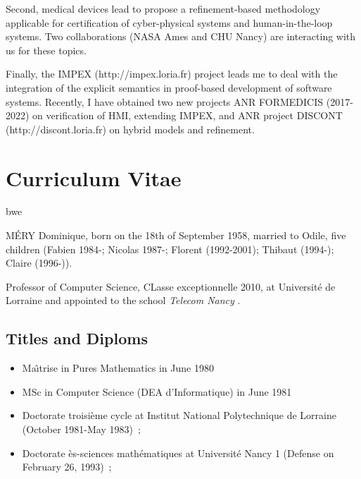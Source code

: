 \documentclass[ 12pt]{article}
\begin{document}
  Second,   medical  devices  lead  to propose a  refinement-based methodology
  applicable  for   certification    of  cyber-physical  systems   and
  human-in-the-loop  systems.  Two   collaborations (NASA Ames and  CHU
  Nancy) are interacting with us for these topics.



Finally, the IMPEX (http://impex.loria.fr) project leads me to deal with the integration of
the explicit semantics in  proof-based development of software
systems. Recently, I have obtained two new projects ANR FORMEDICIS
(2017-2022) on verification of HMI, extending IMPEX, and ANR project
DISCONT (http://discont.loria.fr)  on hybrid models and  refinement.







\section{Curriculum Vitae}
\newcommand{\nancyIesial}{\ca{Universit\'{e} de Nancy I~:~Ecole sup\'{e}rieure d'informatique appliqu\'{e}e de Lorraine}}
\newcommand{\inancyIesial}{Universit\'{e} Henri Poincar\'e -  Nancy I}
\newcommand{\nancyIesstin}{\ca{Universit\'{e} de Nancy I~(Ecole sup\'{e}rieure des sciences et technologies de l'ing\'{e}nieur de Nancy)}}
\newcommand{\inancyIesstin}{Universit\'{e} de Nancy I~(Ecole sup\'{e}rieure des sciences et technologies de l'ing\'{e}nieur de Nancy)}

\newcommand{\inpl}{Institut National Polytechnique de Lorraine}

\newcommand{\pr}{Professeur des Universit\'es, section 27 du CNU,}bwe 

\noindent
M\'ERY Dominique,  born on  the  18th of  September 1958,   married to
Odile, five   children     (Fabien 1984-; Nicolas    1987-;    Florent
(1992-2001); Thibaut (1994-); Claire (1996-)).

\noindent
Professor of Computer Science, CLasse exceptionnelle 2010,    at Universit\'e de Lorraine and appointed to the  school \textit{Telecom Nancy }.

\subsection{Titles and Diploms}

\begin{itemize}
\item Ma\^{\i}trise in Pures Mathematics in June 1980
\item MSc in Computer Science (DEA d'Informatique) in June  1981
\item Doctorate troisi\`eme cycle  at Institut National Polytechnique de Lorraine  (October 1981-May 1983)~;
\item Doctorate \`es-sciences math\'ematiques at Universit\'e Nancy 1 (Defense on February 26, 1993)~;
\end{itemize}
\end{document}
